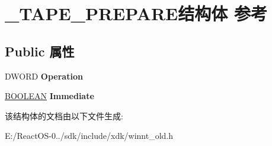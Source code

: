 \hypertarget{struct___t_a_p_e___p_r_e_p_a_r_e}{}\section{\+\_\+\+T\+A\+P\+E\+\_\+\+P\+R\+E\+P\+A\+R\+E结构体 参考}
\label{struct___t_a_p_e___p_r_e_p_a_r_e}
\subsection*{Public 属性}
\begin{DoxyCompactItemize}
\item 
\mbox{\label{struct___t_a_p_e___p_r_e_p_a_r_e_a99b93f349b0fee3326404e6bd741096e}} 
D\+W\+O\+RD {\bfseries Operation}
\item 
\mbox{\label{struct___t_a_p_e___p_r_e_p_a_r_e_af0a504e779a6540b1218d77d122ab6e5}} 
\hyperlink{_processor_bind_8h_a112e3146cb38b6ee95e64d85842e380a}{B\+O\+O\+L\+E\+AN} {\bfseries Immediate}
\end{DoxyCompactItemize}


该结构体的文档由以下文件生成\+:\begin{DoxyCompactItemize}
\item 
E\+:/\+React\+O\+S-\/0../sdk/include/xdk/winnt\+\_\+old.\+h\end{DoxyCompactItemize}
